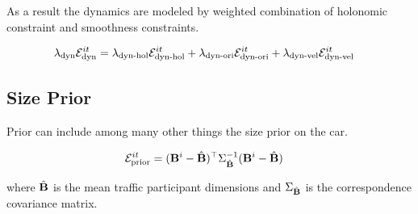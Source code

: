 \documentclass[10pt,twocolumn,letterpaper]{article}
\begin{document}
As a result the dynamics are modeled by weighted combination of holonomic
constraint and smoothness constraints.

\begin{align}
  \lambda_{\text{dyn}}\mathcal{E}^{it}_{\text{dyn}} &= \lambda_{\text{dyn-hol}}\mathcal{E}^{it}_{\text{dyn-hol}} + \lambda_{\text{dyn-ori}}\mathcal{E}^{it}_{\text{dyn-ori}} + \lambda_{\text{dyn-vel}}\mathcal{E}^{it}_{\text{dyn-vel}}
\end{align}
 

\subsection{Size Prior}

Prior can include among many other things the size prior on the car.

\begin{align}
  \label{eq:totalSizeEnergy}
  \mathcal{E}^{it}_{\text{prior}} &= (\mathbf{B}^{i} - \hat{\mathbf{B}})^\top\Sigma_{\hat{\mathbf{B}}}^{-1}(\mathbf{B}^{i} -
  \hat{\mathbf{B}})
\end{align}

where $\hat{\mathbf{B}}$ is the mean traffic participant dimensions and
$\Sigma_{\hat{\mathbf{B}}}$ is the correspondence covariance matrix.
\end{document}
